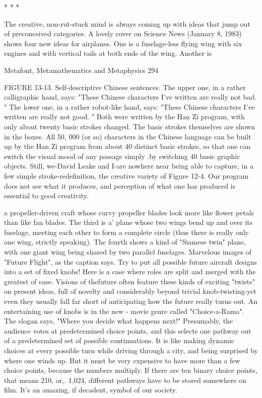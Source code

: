                                          *   *   *

        The creative, non-rut-stuck mind is always coming up with ideas that jump out of
preconceived categories. A lovely cover on Science News (January 8, 1983) shows four
new ideas for airplanes. One is a fuselage-less flying wing with six engines and with
vertical tails at both ends of the wing. Another is




Metafont, Metamathematics and Metaphysics                                                294

FIGURE 13-13. Self-descriptive Chinese sentences. The upper one, in a rather
calligraphic hand, says: "These Chinese characters I've written are really not bad. " The
lower one, in a rather robot-like hand, says: "These Chinese characters I've written are
really not good. " Both were written by the Han Zi program, with only about twenty basic
strokes changed. The basic strokes themselves are shown in the boxes. All 50, 000 (or so)
characters in the Chinese language can be built up by the Han Zi program from about 40
distinct basic strokes, so that one can switch the visual mood of any passage simply .by
switching 40 basic graphic objects. Still, we-David Leake and I-are nowhere near being
able to capture, in a few simple stroke-redefinition, the creative variety of Figure 12-4.
Our program does not see what it produces, and perception of what one has produced is
essential to good creativity.

a propeller-driven craft whose curvy propeller blades look more like flower petals than
like fan blades. The third is a' plane whose two wings bend up and over its fuselage,
meeting each other to form a complete circle (thus there is really only one wing, strictly
speaking). The fourth shows a kind of "Siamese twin" plane, with one giant wing being
shared by two parallel fuselages. Marvelous images of "Future Flight", as the caption
says. Try to put all possible future aircraft designs into a set of fixed knobs! Here is a
case where roles are split and merged with the greatest of ease. Visions of thefuture often
feature these kinds of exciting "twists" on present ideas, full of novelty and considerably
beyond trivial knob-twisting-yet even they usually fall far short of anticipating how the
future really turns out.
        An entertaining use of knobs is in the new - movie genre called "Choice-a-Rama".
The slogan says, "Where you decide what happens next!" Presumably, the audience votes
at predetermined choice points, and this selects one pathway out of a predetermined set of
possible continuations. It is like making dynamic choices at every possible turn while
driving through a city, and being surprised by where one winds up. But it must be very
expensive to have more than a few choice points, because the numbers multiply. If there
are ten binary choice points, that means 210, or,. 1,024, different pathways have to be
stored somewhere on film. It's an amazing, if decadent, symbol of our society.



